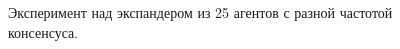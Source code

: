 \documentclass[a4paper,article,14pt]{extarticle}
\begin{document}
\begin{figure}[H]
\begin{center}
\caption{ \label{fig:expander25experiment}
     Эксперимент над экспандером из 25 агентов с разной частотой консенсуса.}
\end{center}
\end{figure}
\end{document}
